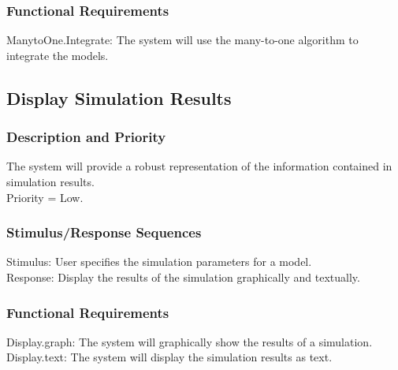 \documentclass{article}
\begin{document}
\subsubsection{Functional Requirements}
ManytoOne.Integrate: The system will use the many-to-one algorithm to integrate the models.

\subsection{Display Simulation Results}
\subsubsection{Description and Priority}
The system will provide a robust representation of the information contained in simulation results.\\
Priority = Low.

\subsubsection{Stimulus/Response Sequences}
Stimulus: User specifies the simulation parameters for a model.\\
Response: Display the results of the simulation graphically and textually.

\subsubsection{Functional Requirements}
Display.graph: The system will graphically show the results of a simulation.\\
Display.text: The system will display the simulation results as text.
\end{document}
